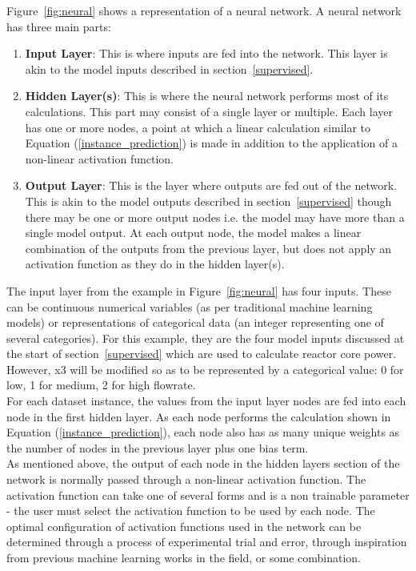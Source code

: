 \noindent
Figure~\ref{fig:neural} shows a representation of a neural network. A neural network has three main parts:

\begin{enumerate}
	
	\item \textbf{Input Layer}: This is where inputs are fed into the network. This layer is akin to the model inputs described in section~\ref{supervised}.
	
	\item \textbf{Hidden Layer(s)}: This is where the neural network performs most of its calculations. This part may consist of a single layer or multiple. Each layer has one or more nodes, a point at which a linear calculation similar to Equation (\ref{instance_prediction}) is made in addition to the application of a non-linear activation function.
	
	\item \textbf{Output Layer}: This is the layer where outputs are fed out of the network. This is akin to the model outputs described in section~\ref{supervised} though there may be one or more output nodes i.e. the model may have more than a single model output. At each output node, the model makes a linear combination of the outputs from the previous layer, but does not apply an activation function as they do in the hidden layer(s).
	
\end{enumerate}

\noindent
The input layer from the example in Figure~\ref{fig:neural} has four inputs. These can be continuous numerical variables (as per traditional machine learning models) or representations of categorical data (an integer representing one of several categories).  For this example, they are the four model inputs discussed at the start of section~\ref{supervised} which are used to calculate reactor core power. However, x3 will be modified so as to be represented by a categorical value: 0 for low, 1 for medium, 2 for high flowrate. \\

\noindent
For each dataset instance, the values from the input layer nodes are fed into each node in the first hidden layer. As each node performs the calculation shown in Equation (\ref{instance_prediction}), each node also has as many unique weights as the number of nodes in the previous layer plus one bias term. \\

\noindent
As mentioned above, the output of each node in the hidden layers section of the network is normally passed through a non-linear activation function. The activation function can take one of several forms and is a non trainable parameter - the user must select the activation function to be used by each node. The optimal configuration of activation functions used in the network can be determined through a process of experimental trial and error, through inspiration from previous machine learning works in the field, or some combination. \\

